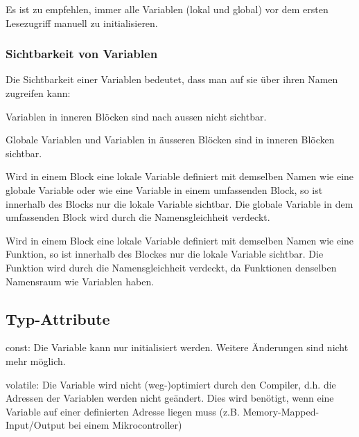 	Es ist zu empfehlen, immer alle Variablen (lokal und global) vor dem ersten Lesezugriff manuell zu initialisieren.
		
	\subsubsection{Sichtbarkeit von Variablen }
		Die Sichtbarkeit einer Variablen bedeutet, dass man auf sie über ihren Namen zugreifen kann:
		
		\begin{compactitem}
			\item Variablen in inneren Blöcken sind nach aussen nicht sichtbar.
			\item Globale Variablen und Variablen in äusseren Blöcken sind in inneren Blöcken sichtbar.
			\item Wird in einem Block eine lokale Variable definiert mit demselben Namen wie eine globale Variable oder wie eine Variable in einem umfassenden Block, so ist innerhalb des Blocks nur die lokale Variable sichtbar. Die globale Variable in dem umfassenden Block wird durch die Namensgleichheit verdeckt.
			\item Wird in einem Block eine lokale Variable definiert mit demselben Namen wie eine Funktion, so ist innerhalb des Blockes nur die lokale Variable sichtbar. Die Funktion wird durch die Namensgleichheit verdeckt, da Funktionen denselben Namensraum wie Variablen haben.
		\end{compactitem}
			
	\subsection{Typ-Attribute }
		\begin{compactitem}
			\item const: Die Variable kann nur initialisiert werden. Weitere Änderungen sind nicht mehr
			möglich.
			
			\item volatile: Die Variable wird nicht (weg-)optimiert durch den Compiler, d.h. die Adressen der Variablen werden nicht geändert. Dies wird benötigt, wenn eine Variable auf einer definierten Adresse liegen muss (z.B. Memory-Mapped-Input/Output bei einem Mikrocontroller)
		\end{compactitem}
	
